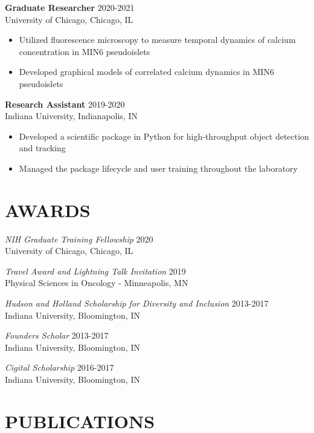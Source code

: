 \documentclass[margin, 10pt]{res} %
\begin{document}
\begin{resume}
\begin{itemize}
\end{itemize}

\textbf{Graduate Researcher} \hfill 2020-2021 \\
University of Chicago, Chicago, IL

\begin{itemize} \itemsep -2pt %

\item Utilized fluorescence microscopy to measure temporal dynamics of calcium concentration in MIN6 pseudoislets

\item Developed graphical models of correlated calcium dynamics in MIN6 pseudoislets

 
\end{itemize}
 
\textbf{Research Assistant} \hfill 2019-2020\\
Indiana University, Indianapolis, IN
\begin{itemize} \itemsep -2pt

\item Developed a scientific package in Python for high-throughput object detection and tracking
\item Managed the package lifecycle and user training throughout the laboratory
\end{itemize}


\section{AWARDS}

{\sl NIH Graduate Training Fellowship} \hfill 2020 \\
University of Chicago, Chicago, IL

{\sl Travel Award and Lightning Talk Invitation} \hfill 2019 \\
Physical Sciences in Oncology - Minneapolis, MN

{\sl Hudson and Holland Scholarship for Diversity and Inclusion} \hfill 2013-2017 \\
Indiana University, Bloomington, IN 

{\sl Founders Scholar} \hfill 2013-2017 \\
Indiana University, Bloomington, IN 

{\sl Cigital Scholarship} \hfill 2016-2017 \\
Indiana University, Bloomington, IN 

\section{PUBLICATIONS}


\end{resume}
\end{document}
